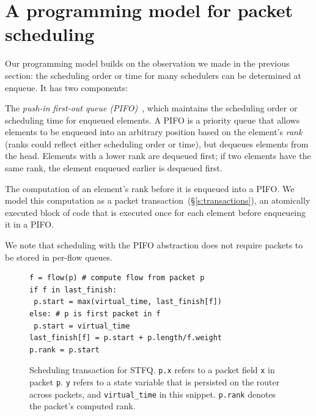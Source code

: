 \section{A programming model for packet scheduling}
\label{s:pifo}

Our programming model builds on the observation we made in the previous
section: the scheduling order or time for many schedulers can be determined at
enqueue. It has two components:
\begin{CompactEnumerate}
\item The {\em push-in first-out queue (PIFO)}~\cite{pifo}, which maintains the
scheduling order or scheduling time for enqueued elements. A PIFO is a priority
queue that allows elements to be enqueued into an arbitrary position based on
the element's {\em rank} (ranks could reflect either scheduling order or time),
but dequeues elements from the head. Elements with a lower rank are dequeued
first; if two elements have the same rank, the element enqueued earlier is
dequeued first.

\item The computation of an element's rank before it is enqueued into
  a PIFO. We model this computation as a packet
    transaction~(\S\ref{s:transactions}), an atomically executed block
  of code that is executed once for each element before enqueueing it
  in a PIFO.
\end{CompactEnumerate}

We note that scheduling with the PIFO abstraction does not require packets to
be stored in per-flow queues.

\begin{figure}
\begin{lstlisting}[style=customc]
f = flow(p) # compute flow from packet p
if f in last_finish:
 p.start = max(virtual_time, last_finish[f])
else: # p is first packet in f
 p.start = virtual_time
last_finish[f] = p.start + p.length/f.weight
p.rank = p.start
\end{lstlisting}
\caption{Scheduling transaction for STFQ. {\tt p.x} refers to a packet
  field {\tt x} in packet {\tt p}.  {\tt y} refers to a state variable
  that is persisted on the router across packets, 
  and {\tt virtual\_time} in this snippet. {\tt p.rank} denotes the
  packet's computed rank.}
\label{fig:sched_trans}
\end{figure}

